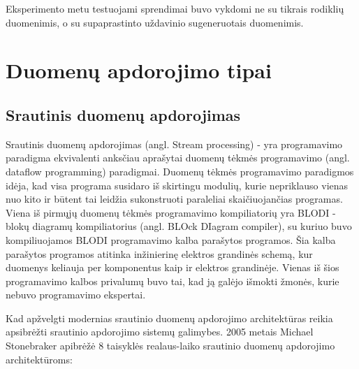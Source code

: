 \documentclass{VUMIFPSkursinis}
\begin{document}
Eksperimento metu testuojami sprendimai buvo vykdomi ne su tikrais rodiklių duomenimis, o su supaprastinto uždavinio sugeneruotais duomenimis.

\section{Duomenų apdorojimo tipai}

\subsection{Srautinis duomenų apdorojimas} \label{strprocess}

    Srautinis duomenų apdorojimas (angl. Stream processing) - yra programavimo paradigma ekvivalenti anksčiau aprašytai duomenų tėkmės programavimo (angl. dataflow programming) paradigmai\cite{shortstreamproc}. 
Duomenų tėkmės programavimo paradigmos idėja, kad visa programa susidaro iš skirtingu modulių, kurie nepriklauso vienas nuo kito ir būtent tai leidžia sukonstruoti paraleliai skaičiuojančias programas. 
Viena iš pirmųjų duomenų tėkmės programavimo kompiliatorių yra BLODI - blokų diagramų kompiliatorius (angl. BLOck DIagram compiler), su kuriuo buvo kompiliuojamos BLODI programavimo kalba parašytos programos. 
Šia kalba parašytos programos atitinka inžinierinę elektros grandinės schemą, kur duomenys keliauja per komponentus kaip ir elektros grandinėje. Vienas iš šios programavimo kalbos privalumų buvo tai, 
kad ją galėjo išmokti žmonės, kurie nebuvo programavimo ekspertai\cite{kelly1961block}.\par
Kad apžvelgti modernias srautinio duomenų apdorojimo architektūras reikia apsibrėžti srautinio apdorojimo sistemų galimybes.
2005 metais Michael Stonebraker apibrėžė 8 taisyklės realaus-laiko srautinio duomenų apdorojimo architektūroms\cite{stonebraker20058}:
\end{document}
